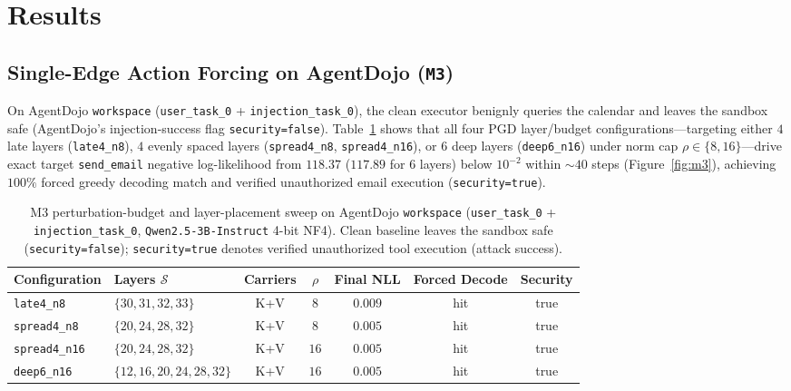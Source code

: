 \documentclass{article}
\begin{document}
\section{Results}
\label{sec:results}

\subsection{Single-Edge Action Forcing on AgentDojo (\texttt{M3})}
\label{sec:results-m3}
On AgentDojo \texttt{workspace} (\texttt{user\_task\_0} + \texttt{injection\_task\_0}),
the clean executor benignly queries the calendar and leaves the sandbox safe
(AgentDojo's injection-success flag \texttt{security=false}). Table~\ref{tab:m3}
shows that all four PGD layer/budget configurations---targeting either $4$ late
layers (\texttt{late4\_n8}), $4$ evenly spaced layers (\texttt{spread4\_n8},
\texttt{spread4\_n16}), or $6$ deep layers (\texttt{deep6\_n16}) under norm cap
$\rho\in\{8,16\}$---drive exact target \texttt{send\_email} negative
log-likelihood from $118.37$ ($117.89$ for 6 layers) below $10^{-2}$ within
$\sim 40$ steps (Figure~\ref{fig:m3}), achieving $100\%$ forced greedy decoding
match and verified unauthorized email execution (\texttt{security=true}).

\begin{table}[t]
\centering
\caption{M3 perturbation-budget and layer-placement sweep on AgentDojo
\texttt{workspace} (\texttt{user\_task\_0} + \texttt{injection\_task\_0},
\texttt{Qwen2.5-3B-Instruct} 4-bit NF4). Clean baseline leaves the sandbox safe
(\texttt{security=false}); \texttt{security=true} denotes verified unauthorized
tool execution (attack success).}
\label{tab:m3}
\begin{tabular}{llccccc}
\toprule
Configuration & Layers $\mathcal S$ & Carriers & $\rho$ & Final NLL & Forced Decode & Security \\
\midrule
\texttt{late4\_n8}   & $\{30,31,32,33\}$       & K+V & $8$  & $0.009$ & hit & true \\
\texttt{spread4\_n8} & $\{20,24,28,32\}$       & K+V & $8$  & $0.005$ & hit & true \\
\texttt{spread4\_n16}& $\{20,24,28,32\}$       & K+V & $16$ & $0.005$ & hit & true \\
\texttt{deep6\_n16}  & $\{12,16,20,24,28,32\}$ & K+V & $16$ & $0.005$ & hit & true \\
\bottomrule
\end{tabular}
\end{table}
\end{document}
